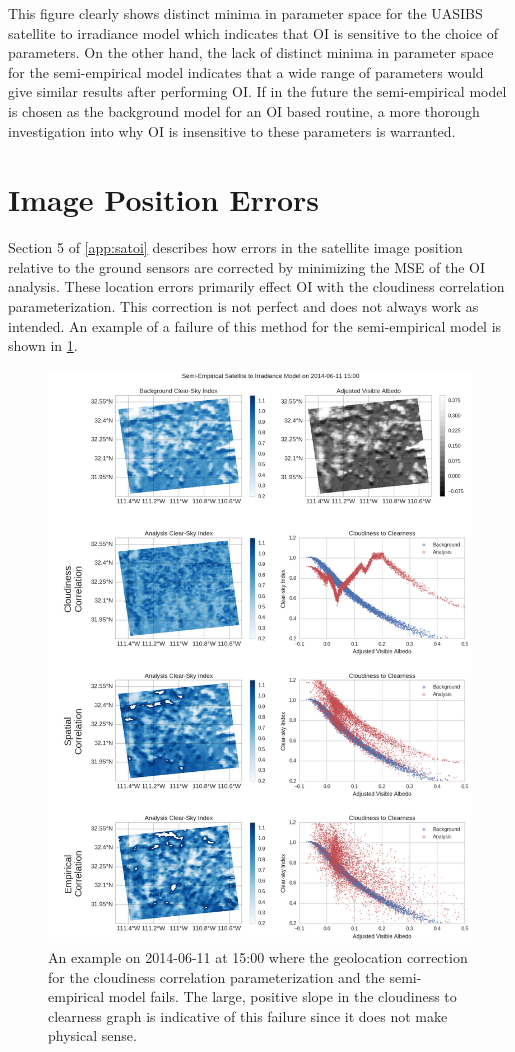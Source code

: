 This figure clearly shows distinct minima in parameter space for the
UASIBS satellite to irradiance model which indicates that  OI is
sensitive to the choice of parameters.
On the other hand, the lack of distinct minima in parameter space for
the semi-empirical model indicates that a wide range of parameters would
give similar results after performing OI.
If in the future the semi-empirical model is chosen as the background model
for an OI based routine, a more thorough investigation into why OI is
insensitive to these parameters is warranted.


\section{Image Position Errors}
Section 5 of \cref{app:satoi} describes how errors in the satellite
image position relative to the ground sensors are corrected by
minimizing the MSE of the OI analysis.
These location errors primarily effect OI with the cloudiness
correlation parameterization.
This correction is not perfect and does not always work as intended.
An example of a failure of this method for the semi-empirical model is
shown in \cref{fig:parallax_err}.


\begin{figure}[p]
\centering
\includegraphics[width=.9\textwidth]{figs/cld_to_clear_Semi-Empirical_2014-06-11.png}
\caption[An example of a failure of the geolocation correction]{
  An example on 2014-06-11 at 15:00 where the geolocation correction
  for the cloudiness correlation parameterization and the
  semi-empirical model fails. The large, positive slope in the
  cloudiness to clearness graph is indicative of this failure since it
  does not make physical sense.}
\label{fig:parallax_err}
\end{figure}

